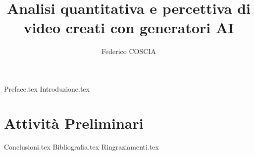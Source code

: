 \documentclass[a4paper,12pt]{report}
\begin{document}
\title{Analisi quantitativa e percettiva di video creati con generatori AI}
\author{Federico COSCIA}

{Preface.tex}
{Introduzione.tex}

\chapter{Attività Preliminari}

{Conclusioni.tex}
{Bibliografia.tex}
{Ringraziamenti.tex}
\end{document}
